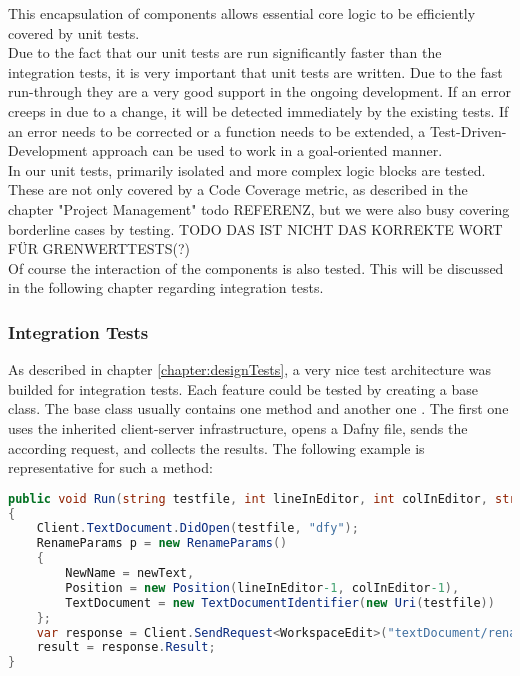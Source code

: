 This encapsulation of components allows essential core logic to be efficiently covered by unit tests. \\

Due to the fact that our unit tests are run significantly faster than the integration tests, it is very important that unit tests are written.
Due to the fast run-through they are a very good support in the ongoing development.
If an error creeps in due to a change, it will be detected immediately by the existing tests.
If an error needs to be corrected or a function needs to be extended, a Test-Driven-Development approach can be used to work in a goal-oriented manner. \\

In our unit tests, primarily isolated and more complex logic blocks are tested. These are not only covered by a Code Coverage metric, as described in the chapter "Project Management" todo REFERENZ, but we were also busy covering borderline cases by testing. TODO DAS IST NICHT DAS KORREKTE WORT FÜR GRENWERTTESTS(?) \\

Of course the interaction of the components is also tested. This will be discussed in the following chapter regarding integration tests.

\subsubsection{Integration Tests}
As described in chapter \ref{chapter:designTests}, a very nice test architecture was builded for integration tests. Each feature could be tested by creating a base class. The base class usually contains one method  and another one . The first one uses the inherited client-server infrastructure, opens a Dafny file, sends the according request, and collects the results. The following example is representative for such a method:

\begin{lstlisting}[language=csharp, caption={Finding a Declaration}, captionpos=b, label={lst:visitorfinddecl}]
public void Run(string testfile, int lineInEditor, int colInEditor, string newText = "newText")
{
    Client.TextDocument.DidOpen(testfile, "dfy");
    RenameParams p = new RenameParams()
    {
        NewName = newText,
        Position = new Position(lineInEditor-1, colInEditor-1),
        TextDocument = new TextDocumentIdentifier(new Uri(testfile))
    };
    var response = Client.SendRequest<WorkspaceEdit>("textDocument/rename", p, CancellationSource.Token);
    result = response.Result;
}
\end{lstlisting}

